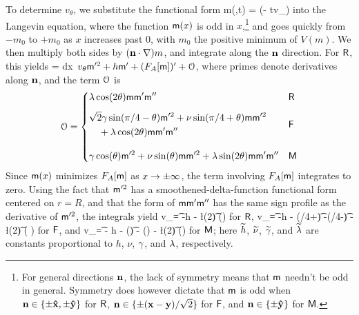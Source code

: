 \documentclass[pra,aps,twocolumn,groupedaddress,superscriptaddress,nofootinbib,preprintnumbers]{revtex4-2}
\begin{document}
	To determine $v_\theta$, we substitute the functional form
	\be m(\bfr,t) = \sfm(\bfr \cdot \bfn - tv_\theta)\ee  
	into the Langevin equation, where the function $\mathsf{m}(x)$ is odd in $x$,\footnote{For general directions $\mathbf{n}$, the lack of symmetry means that $\mathsf{m}$ needn't be odd in general. Symmetry does however dictate that $\mathsf{m}$ is odd when $\mathbf{n} \in \{ \pm {\mathbf{\hat x}}, \pm {\mathbf{\hat y}}\}$ for $\mathsf{R}$, $\mathbf{n} \in \{\pm (\mathbf{x} - \mathbf{y})/\sqrt2\}$ for $\mathsf{F}$, and $\mathbf{n} \in \{\pm {\mathbf{\hat y}}\}$ for $\mathsf{M}$. } and goes quickly from $-m_0$ to $+m_0$ as $x$ increases past $0$, with $m_0$ the positive minimum of $V(m)$. We then multiply both sides by $(\mathbf{n} \cdot \nabla)m$, and integrate along the $\mathbf{n}$ direction. For $\mathsf{R}$, this yields 
	 = \int dx\, \(v_\theta \mathsf{m}'^2 + h\mathsf{m}' + (F_A[\mathsf{m}])'  + \mathcal{O}\), \ee 
	where primes denote derivatives along $\mathbf{n}$, and the term $\mathcal{O}$ is 
\begin{equation}
	\mathcal{O} = \begin{dcases} 
		\lambda \cos(2\theta) \mathsf{m} \mathsf{m}' \mathsf{m}'' & \mathsf{R} \\[1ex]
		\begin{aligned}
			&\sqrt{2}\gamma \sin(\pi/4-\theta) \mathsf{m}'^2 + \nu \sin(\pi/4+\theta) \mathsf{m} \mathsf{m}'^2 \\
			&\quad + \lambda \cos(2\theta) \mathsf{m} \mathsf{m}'\mathsf{m}'' 
		\end{aligned} & \mathsf{F} \\[2ex]
		\gamma\cos(\theta) \mathsf{m}'^2 + \nu \sin(\theta) \mathsf{m}\mathsf{m}'^2 + \lambda \sin(2\theta) \mathsf{m}\mathsf{m}' \mathsf{m}'' & \mathsf{M} 
	\end{dcases}
\end{equation}
	Since $\mathsf{m}(x)$ minimizes $F_A[\mathsf{m}]$ as $x \rightarrow\pm\infty$, the term involving $F_A[\mathsf{m}]$ integrates to zero. Using the fact that $\mathsf{m}'^2$ has a smoothened-delta-function functional form centered on $r=R$, and that the form of $\mathsf{m} \mathsf{m}' \mathsf{m}''$ has the same sign profile as the derivative of $\mathsf{m}'^2$, the integrals yield
	\be \label{vtr} v_\t  = -\wt h -  \wt \l \cos(2\t)  \qq (\sfR)\ee 
	for $\mathsf{R}$,
	\be \label{vtf} v_\t = -\wt h - \wt \nu \sin(\pi/4+\t) -\wt \g \sin(\pi/4-\t) -  \wt \l \cos(2\t)  \qq( \sfF) \ee 
	for $\mathsf{F}$, and 
	\be \label{vtm} v_\t = - \wt h - \wt \nu \sin(\t) - \wt \g \cos(\theta) - \wt \l \sin(2\t) \qq(\sfM) \ee 
	for $\mathsf{M}$; here $\widetilde h$, $\widetilde \nu$, $\widetilde {\gamma}$, and $\widetilde {\lambda}$ are constants proportional to $h$, $\nu$, $\gamma$, and $\lambda$, respectively.
	
\end{document}
